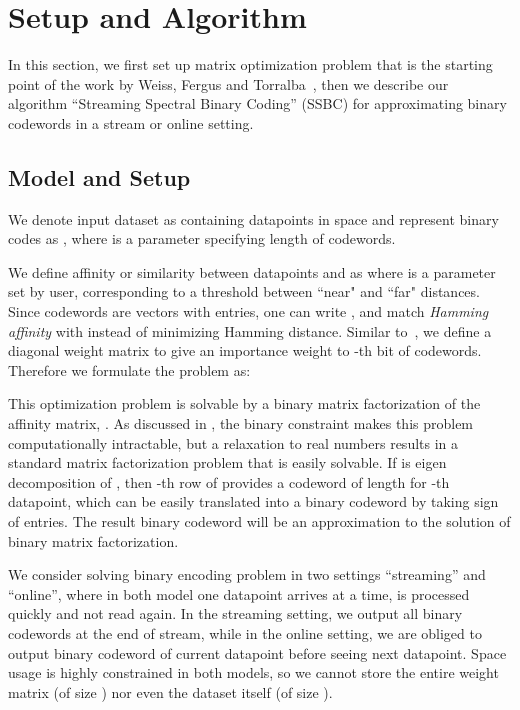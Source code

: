 \documentclass{sig-alternate}
\begin{document}
\section{Setup and Algorithm}\label{sec:algorithm}
In this section, we first set up matrix optimization problem that is the starting point of the work by Weiss, Fergus and Torralba~\cite{weiss2012multidimensional}, then we describe our algorithm ``Streaming Spectral Binary Coding'' (SSBC) for approximating binary codewords in a stream or online setting.
\subsection{Model and Setup}\label{sec:model}  
We denote input dataset as  containing  datapoints in  space and represent binary codes as , where  is a parameter specifying length of codewords.

We define affinity or similarity between datapoints  and  as  where  is a parameter set by user,  corresponding to a threshold between ``near" and ``far" distances.
Since codewords are vectors with  entries, one can write , and match \textit{Hamming affinity}  with   instead of minimizing Hamming distance. 
Similar to~\cite{weiss2012multidimensional}, we define a diagonal weight matrix  to give an importance weight  to -th bit of codewords.
Therefore we formulate the problem as:


This optimization problem is solvable by a binary matrix factorization of the affinity matrix, . As discussed in \cite{srebro2003weighted,weiss2012multidimensional}, the  binary constraint makes this problem computationally intractable, but a relaxation to real numbers results in a standard matrix factorization problem that is easily solvable. 
If  is eigen decomposition of , then -th row of  provides a codeword of length  for -th datapoint, which can be easily translated into a binary codeword by taking sign of entries.
The result binary codeword will be an approximation to the solution of binary matrix factorization. 

We consider solving binary encoding problem in two settings ``streaming'' and ``online'', where in both model one datapoint arrives at a time, is processed quickly and not read again. In the streaming setting, we output all binary codewords at the end of stream, while in the online setting, we are obliged to output binary codeword of current datapoint before seeing next datapoint.
Space usage is highly constrained in both models, so we cannot store the entire weight matrix  (of size ) nor even the dataset itself (of size ).   
\end{document}
